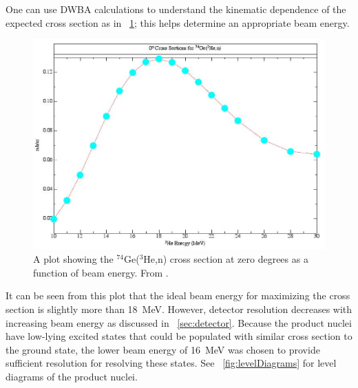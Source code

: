 One can use DWBA calculations to understand the kinematic dependence of the expected cross section as in {\fig}~\ref{fig:optimizeCrossSection}; this helps determine an appropriate beam energy.  
\begin{figure}[htp]
\centering
\includegraphics[width=1.0\textwidth]{figures/74Ge_0plus_xsection.eps}
\caption{A plot showing the $^{74}$Ge($^3$He,n) \zp cross section at zero degrees as a function of beam energy.  From \citep{schiffer_privateCommunication}.}
\label{fig:optimizeCrossSection}
\end{figure}
It can be seen from this plot that the ideal beam energy for maximizing the \reaction cross section is slightly more than 18~MeV.  However, detector resolution decreases with increasing beam energy as discussed in {\sect}~\ref{sec:detector}.  Because the product nuclei \SeProducts have low-lying excited \tp states that could be populated with similar cross section to the ground state, the lower beam energy of 16~MeV was chosen to provide sufficient resolution for resolving these states.  See {\fig}~\ref{fig:levelDiagrams} for level diagrams of the product nuclei.
